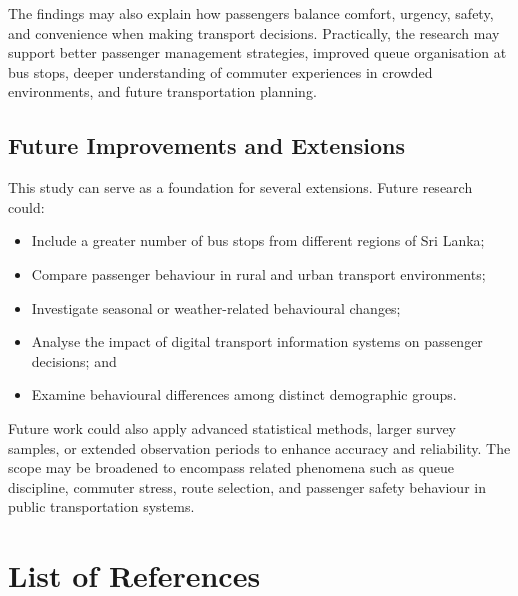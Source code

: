 \documentclass[12pt, a4paper]{report}
\begin{document}
The findings may also explain how passengers balance comfort, urgency, safety, and
convenience when making transport decisions. Practically, the research may support better
passenger management strategies, improved queue organisation at bus stops, deeper
understanding of commuter experiences in crowded environments, and future transportation
planning.

\section{Future Improvements and Extensions}

This study can serve as a foundation for several extensions. Future research could:

\begin{itemize}[noitemsep]
    \item Include a greater number of bus stops from different regions of Sri Lanka;
    \item Compare passenger behaviour in rural and urban transport environments;
    \item Investigate seasonal or weather-related behavioural changes;
    \item Analyse the impact of digital transport information systems on passenger decisions; and
    \item Examine behavioural differences among distinct demographic groups.
\end{itemize}

Future work could also apply advanced statistical methods, larger survey samples, or
extended observation periods to enhance accuracy and reliability. The scope may be
broadened to encompass related phenomena such as queue discipline, commuter stress,
route selection, and passenger safety behaviour in public transportation systems.

\setcounter{secnumdepth}{-1}

\chapter*{List of References}
\end{document}
